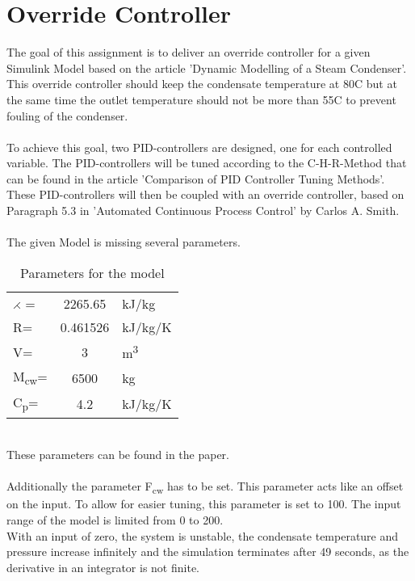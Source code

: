\section{Override Controller}

The goal of this assignment is to deliver an override controller for a given Simulink Model based on the article 'Dynamic Modelling of a Steam Condenser'.
This override controller should keep the condensate temperature at 80\degree C but at the same time the outlet temperature should not be more than 55\degree C to prevent fouling of the condenser. \\
\\
To achieve this goal, two PID-controllers are designed, one for each controlled variable. The PID-controllers will be tuned according to the C-H-R-Method that can be found in the article 'Comparison of PID Controller Tuning Methods'. 
These PID-controllers will then be coupled with an override controller, based on Paragraph 5.3 in 'Automated Continuous Process Control' by Carlos A. Smith.\\
\\
The given Model is missing several parameters.\\
\begin{table}[h]
\centering
\begin{tabular}{|l c l|}
	\hline
	$\rightthreetimes$ = 	&2265.65    &kJ/kg\\
	R=			&0.461526   &kJ/kg/K\\
	V=			&3          &m\textsuperscript{3}\\
	M\textsubscript{cw}=		&6500       &kg\\
	C\textsubscript{p}=			&4.2        &kJ/kg/K\\
	\hline
\end{tabular}
\caption{Parameters for the model}
\end{table}\\
These parameters can be found in the paper.\\
\\
Additionally the parameter F\textsubscript{cw} has to be set. This parameter acts like an offset on the input. To allow for easier tuning, this parameter is set to 100. The input range of the model is limited from 0 to 200. \\
With an input of zero, the system is unstable, the condensate temperature and pressure increase infinitely and the simulation terminates after 49 seconds, as the derivative in an integrator is not finite. 

